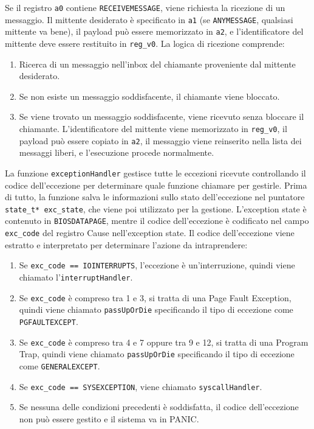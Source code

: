 \documentclass[a4paper]{article}
\begin{document}
Se il registro \verb+a0+ contiene \verb+RECEIVEMESSAGE+, viene richiesta la ricezione di un messaggio. Il mittente desiderato è specificato in \verb+a1+ (se \verb+ANYMESSAGE+, qualsiasi mittente va bene), il payload può essere memorizzato in \verb+a2+, e l'identificatore del mittente deve essere restituito in \verb+reg_v0+. La logica di ricezione comprende:
\begin{enumerate}
\item Ricerca di un messaggio nell'inbox del chiamante proveniente dal mittente desiderato.
\item Se non esiste un messaggio soddisfacente, il chiamante viene bloccato.
\item Se viene trovato un messaggio soddisfacente, viene ricevuto senza bloccare il chiamante. L'identificatore del mittente viene memorizzato in \verb+reg_v0+, il payload può essere copiato in \verb+a2+, il messaggio viene reinserito nella lista dei messaggi liberi, e l'esecuzione procede normalmente.
\end{enumerate}

La funzione \verb+exceptionHandler+ gestisce tutte le eccezioni ricevute controllando il codice dell'eccezione per determinare quale funzione chiamare per gestirle. Prima di tutto, la funzione salva le informazioni sullo stato dell'eccezione nel puntatore \verb+state_t* exc_state+, che viene poi utilizzato per la gestione. L'exception state è contenuto in \verb+BIOSDATAPAGE+, mentre il codice dell'eccezione è codificato nel campo \verb+exc_code+ del registro Cause nell'exception state. Il codice dell'eccezione viene estratto e interpretato per determinare l'azione da intraprendere:
\begin{enumerate}
\item Se \verb+exc_code == IOINTERRUPTS+, l'eccezione è un'interruzione, quindi viene chiamato l'\verb+interruptHandler+.
\item Se \verb+exc_code+ è compreso tra 1 e 3, si tratta di una Page Fault Exception, quindi viene chiamato \verb+passUpOrDie+ specificando il tipo di eccezione come \verb+PGFAULTEXCEPT+.
\item Se \verb+exc_code+ è compreso tra 4 e 7 oppure tra 9 e 12, si tratta di una Program Trap, quindi viene chiamato \verb+passUpOrDie+ specificando il tipo di eccezione come \verb+GENERALEXCEPT+.
\item Se \verb+exc_code == SYSEXCEPTION+, viene chiamato \verb+syscallHandler+.
\item Se nessuna delle condizioni precedenti è soddisfatta, il codice dell'eccezione non può essere gestito e il sistema va in PANIC.
\end{enumerate}
\end{document}

